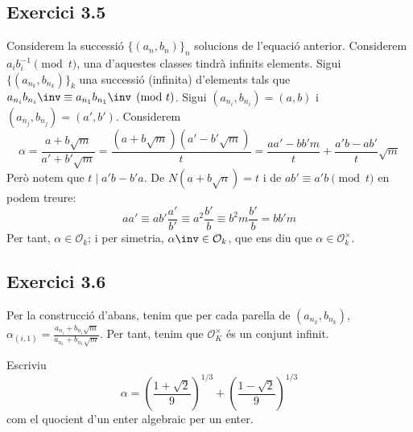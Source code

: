\documentclass[11pt, a4paper]{article}
\begin{document}
    \subsection{Exercici 3.5}
    Considerem la successió $\{(a_n,b_n)\}_n$ solucions de l'equació anterior. Considerem $a_ib_i^{-1}\pmod t$, una d'aquestes classes tindrà infinits elements. Sigui $\{(a_{n_k},b_{n_k})\}_k$ una successió (infinita) d'elements tals que $a_{n_i}b_{n_i}\inv\equiv a_{n_1}b_{n_1}\inv\pmod t$. Sigui $(a_{n_i},b_{n_i})=(a,b)$ i $(a_{n_j},b_{n_j})=(a',b')$. Considerem
    \[
        \alpha=\frac{a+b\sqrt{m}}{a'+b'\sqrt{m}}=\frac{(a+b\sqrt{m})(a'-b'\sqrt{m})}{t}=\frac{aa'-bb'm}{t}+\frac{a'b-ab'}{t}\sqrt{m}
    \]
    Però notem que $t\mid a'b-b'a$. De $N(a+b\sqrt{n})=t$ i de $ab'\equiv a'b\pmod t$ en podem treure:
    \[
        aa'\equiv ab' \frac{a'}{b'}\equiv a^2\frac{b'}{b}\equiv b^2m\frac{b'}{b}=bb'm 
    \]
    Per tant, $\alpha\in\mathcal{O}_k$; i per simetria, $\alpha\inv\in\mathcal{O}_k$, que ens diu que $\alpha\in\mathcal{O}_k^\times$.
    \subsection{Exercici 3.6}
    Per la construcció d'abans, tenim que per cada parella de $(a_{n_k},b_{n_k})$, $\alpha_{(i,1)}=\frac{a_{n_i}+b_{n_i}\sqrt{m}}{a_{n_1}+b_{n_1}\sqrt{m}}$. Per tant, tenim que $\mathcal{O}_K^\times$ és un conjunt infinit.
    \newpage
    \begin{tcolorbox}[title=\section{FP 4 Exercici 4}]
        Escriviu
        \[
            \alpha=\left(\frac{1+\sqrt{2}}{9}\right)^{1/3}+\left(\frac{1-\sqrt{2}}{9}\right)^{1/3}
        \]
        com el quocient d'un enter algebraic per un enter.
    \end{tcolorbox}
\end{document}
